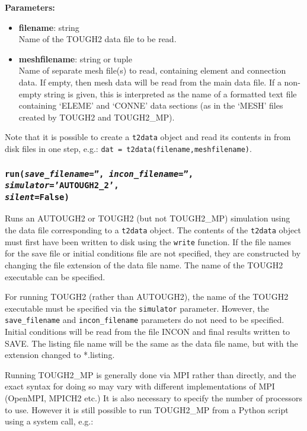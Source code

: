 \textbf{Parameters:}
\begin{itemize}
\item \textbf{filename}: string\\
  Name of the TOUGH2 data file to be read.
\item \textbf{meshfilename}: string or tuple\\
  Name of separate mesh file(s) to read, containing element and connection data.  If empty, then mesh data will be read from the main data file.  If a non-empty string is given, this is interpreted as the name of a formatted text file containing `ELEME' and `CONNE' data sections (as in the `MESH' files created by TOUGH2 and TOUGH2\_MP).
\end{itemize}

Note that it is possible to create a \texttt{t2data} object and read its contents in from disk files in one step, e.g.: \texttt{dat = t2data(filename,meshfilename)}.

\begin{snugshade}
\subsubsection{\texttt{run(\emph{save\_filename}='', \emph{incon\_filename}='', \emph{simulator}='AUTOUGH2\_2',\\
    \emph{silent}=False)}}
\end{snugshade}
\label{sec:t2data:run}

Runs an AUTOUGH2 or TOUGH2 (but not TOUGH2\_MP) simulation using the data file corresponding to a \texttt{t2data} object.  The contents of the \texttt{t2data} object must first have been written to disk using the \texttt{write} function.  If the file names for the save file or initial conditions file are not specified, they are constructed by changing the file extension of the data file name.  The name of the TOUGH2 executable can be specified.

For running TOUGH2 (rather than AUTOUGH2), the name of the TOUGH2 executable must be specified via the \texttt{simulator} parameter.  However, the \texttt{save\_filename} and \texttt{incon\_filename} parameters do not need to be specified.  Initial conditions will be read from the file INCON and final results written to SAVE.  The listing file name will be the same as the data file name, but with the extension changed to *.listing.

Running TOUGH2\_MP is generally done via MPI rather than directly, and the exact syntax for doing so may vary with different implementations of MPI (OpenMPI, MPICH2 etc.)  It is also necessary to specify the number of processors to use.  However it is still possible to run TOUGH2\_MP from a Python script using a system call, e.g.:

